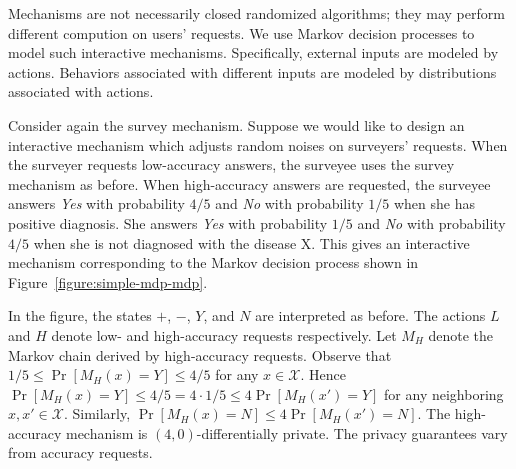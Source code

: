 Mechanisms are not necessarily closed randomized algorithms; they may
perform different compution on users' requests. 
We use Markov decision processes to model such 
interactive mechanisms. Specifically, external inputs are modeled by
actions. Behaviors associated with different inputs are modeled by
distributions associated with actions.

Consider again the survey mechanism. Suppose we would like to design
an interactive mechanism which adjusts random noises on surveyers'
requests. When the surveyer requests low-accuracy answers, the
surveyee uses the survey mechanism as before. When high-accuracy
answers are requested, the surveyee answers \textit{Yes} with
probability $4/5$ and \textit{No} with probability $1/5$ when she has
positive diagnosis. She answers \textit{Yes} with probability $1/5$
and \textit{No} with probability $4/5$ when she is not
diagnosed with the disease X. This gives an interactive mechanism
corresponding to the Markov decision process shown in
Figure~\ref{figure:simple-mdp-mdp}. 

In the figure, the states $+$,
$-$, $Y$, and $N$ are interpreted as before. The actions $L$ and $H$
denote low- and high-accuracy requests respectively. Let $M_H$ denote
the Markov chain derived by high-accuracy requests.
Observe that $1/5 \leq \Pr[M_H(x) = Y] \leq 4/5$ for any $x
\in \mathcal{X}$. Hence $\Pr[M_H (x) = Y] \leq 4/5 = 4 \cdot 1/5 \leq
4 \Pr[M_H (x') = Y]$ for any neighboring $x, x' \in
\mathcal{X}$. Similarly, $\Pr[M_H (x) = N] \leq 4 \Pr[M_H (x') =
N]$. The high-accuracy mechanism is $(4,0)$-differentially private. 
The privacy guarantees vary from accuracy requests.